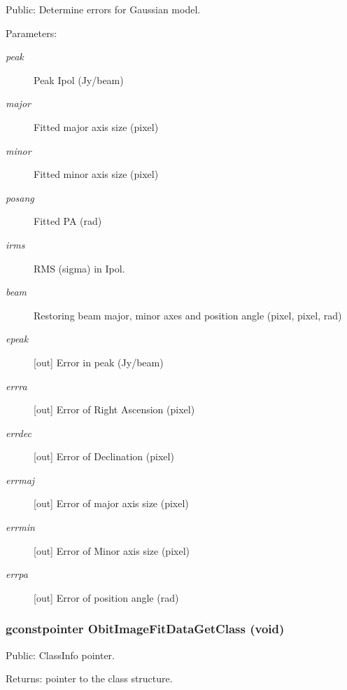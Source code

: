 Public: Determine errors for Gaussian model. 

\begin{Desc}
\item[Parameters:]
\begin{description}
\item[{\em peak}]Peak Ipol (Jy/beam) \item[{\em major}]Fitted major axis size (pixel) \item[{\em minor}]Fitted minor axis size (pixel) \item[{\em posang}]Fitted PA (rad) \item[{\em irms}]RMS (sigma) in Ipol. \item[{\em beam}]Restoring beam major, minor axes and position angle (pixel, pixel, rad) \item[{\em epeak}][out] Error in peak (Jy/beam) \item[{\em errra}][out] Error of Right Ascension (pixel) \item[{\em errdec}][out] Error of Declination (pixel) \item[{\em errmaj}][out] Error of major axis size (pixel) \item[{\em errmin}][out] Error of Minor axis size (pixel) \item[{\em errpa}][out] Error of position angle (rad) \end{description}
\end{Desc}
\subsubsection{\setlength{\rightskip}{0pt plus 5cm}gconstpointer Obit\-Image\-Fit\-Data\-Get\-Class (void)}\label{ObitImageFitData_8h_a11}


Public: Class\-Info pointer. 

\begin{Desc}
\item[Returns:]pointer to the class structure. \end{Desc}
